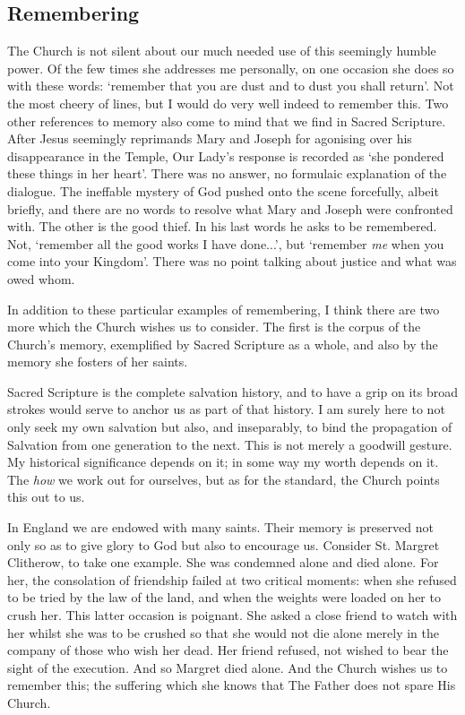 \documentclass[12pt]{article}
\begin{document}
\subsection*{Remembering}

The Church is not silent about our much needed use of this seemingly humble power. Of the few times she addresses me personally, on one occasion she does so with these words: `remember that you are dust and to dust you shall return'. Not the most cheery of lines, but I would do very well indeed to remember this. Two other references to memory also come to mind that we find in Sacred Scripture. After Jesus seemingly reprimands Mary and Joseph for agonising over his disappearance in the Temple, Our Lady's response is recorded as `she pondered these things in her heart'. There was no answer, no formulaic explanation of the dialogue. The ineffable mystery of God pushed onto the scene forcefully, albeit briefly, and there are no words to resolve what Mary and Joseph were confronted with. The other is the good thief. In his last words he asks to be remembered. Not, `remember all the good works I have done...', but `remember \emph{me} when you come into your Kingdom'. There was no point talking about justice and what was owed whom.

In addition to these particular examples of remembering, I think there are two more which the Church wishes us to consider. The first is the corpus of the Church’s memory, exemplified by Sacred Scripture as a whole, and also by the memory she fosters of her saints.

Sacred Scripture is the complete salvation history, and to have a grip on its broad strokes would serve to anchor us as part of that history. I am surely here to not only seek my own salvation but also, and inseparably, to bind the propagation of Salvation from one generation to the next. This is not merely a goodwill gesture. My historical significance depends on it; in some way my worth depends on it. The \emph{how} we work out for ourselves, but as for the standard, the Church points this out to us.

In England we are endowed with many saints. Their memory is preserved not only so as to give glory to God but also to encourage us. Consider St. Margret Clitherow, to take one example. She was condemned alone and died alone. For her, the consolation of friendship failed at two critical moments: when she refused to be tried by the law of the land, and when the weights were loaded on her to crush her. This latter occasion is poignant. She asked a close friend to watch with her whilst she was to be crushed so that she would not die alone merely in the company of those who wish her dead. Her friend refused, not wished to bear the sight of the execution. And so Margret died alone. And the Church wishes us to remember this; the suffering which she knows that The Father does not spare His Church.
\end{document}
